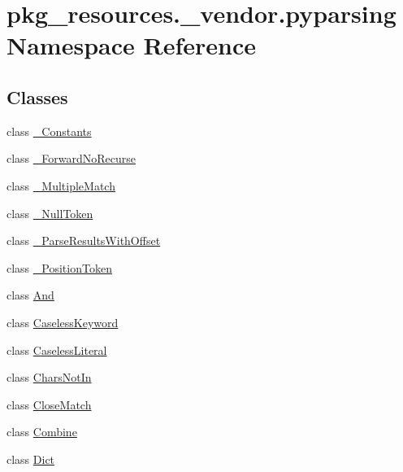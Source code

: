 \hypertarget{namespacepkg__resources_1_1__vendor_1_1pyparsing}{}\section{pkg\+\_\+resources.\+\_\+vendor.\+pyparsing Namespace Reference}
\label{namespacepkg__resources_1_1__vendor_1_1pyparsing}
\subsection*{Classes}
\begin{DoxyCompactItemize}
\item 
class \hyperlink{classpkg__resources_1_1__vendor_1_1pyparsing_1_1___constants}{\+\_\+\+Constants}
\item 
class \hyperlink{classpkg__resources_1_1__vendor_1_1pyparsing_1_1___forward_no_recurse}{\+\_\+\+Forward\+No\+Recurse}
\item 
class \hyperlink{classpkg__resources_1_1__vendor_1_1pyparsing_1_1___multiple_match}{\+\_\+\+Multiple\+Match}
\item 
class \hyperlink{classpkg__resources_1_1__vendor_1_1pyparsing_1_1___null_token}{\+\_\+\+Null\+Token}
\item 
class \hyperlink{classpkg__resources_1_1__vendor_1_1pyparsing_1_1___parse_results_with_offset}{\+\_\+\+Parse\+Results\+With\+Offset}
\item 
class \hyperlink{classpkg__resources_1_1__vendor_1_1pyparsing_1_1___position_token}{\+\_\+\+Position\+Token}
\item 
class \hyperlink{classpkg__resources_1_1__vendor_1_1pyparsing_1_1_and}{And}
\item 
class \hyperlink{classpkg__resources_1_1__vendor_1_1pyparsing_1_1_caseless_keyword}{Caseless\+Keyword}
\item 
class \hyperlink{classpkg__resources_1_1__vendor_1_1pyparsing_1_1_caseless_literal}{Caseless\+Literal}
\item 
class \hyperlink{classpkg__resources_1_1__vendor_1_1pyparsing_1_1_chars_not_in}{Chars\+Not\+In}
\item 
class \hyperlink{classpkg__resources_1_1__vendor_1_1pyparsing_1_1_close_match}{Close\+Match}
\item 
class \hyperlink{classpkg__resources_1_1__vendor_1_1pyparsing_1_1_combine}{Combine}
\item 
class \hyperlink{classpkg__resources_1_1__vendor_1_1pyparsing_1_1_dict}{Dict}

\end{DoxyCompactItemize}
